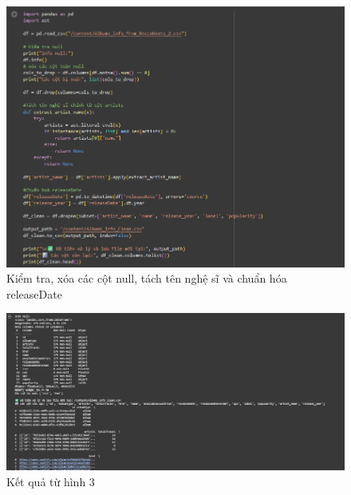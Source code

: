 \begin{figure}[H]
    \centering
    \includegraphics[width=0.9\linewidth]{../graphics/data2/4.png}
    \caption{Kiểm tra, xóa các cột null, tách tên nghệ sĩ và chuẩn hóa releaseDate}
    \label{fig:placeholder}
\end{figure}

\begin{figure}[H]
    \centering
    \includegraphics[width=0.9\linewidth]{../graphics/data2/5.png}
    \caption{Kết quả từ hình 3}
    \label{fig:placeholder}
\end{figure}


